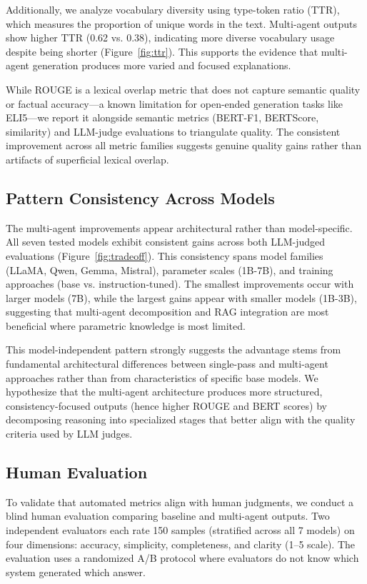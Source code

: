 Additionally, we analyze vocabulary diversity using type-token ratio (TTR), which measures the proportion of unique words in the text. Multi-agent outputs show higher TTR (0.62 vs. 0.38), indicating more diverse vocabulary usage despite being shorter (Figure~\ref{fig:ttr}). This supports the evidence that multi-agent generation produces more varied and focused explanations.

While ROUGE is a lexical overlap metric that does not capture semantic quality or factual accuracy---a known limitation for open-ended generation tasks like ELI5---we report it alongside semantic metrics (BERT-F1, BERTScore, similarity) and LLM-judge evaluations to triangulate quality. The consistent improvement across all metric families suggests genuine quality gains rather than artifacts of superficial lexical overlap.

\subsection{Pattern Consistency Across Models}



The multi-agent improvements appear architectural rather than model-specific. All seven tested models exhibit consistent gains across both LLM-judged evaluations (Figure~\ref{fig:tradeoff}). This consistency spans model families (LLaMA, Qwen, Gemma, Mistral), parameter scales (1B-7B), and training approaches (base vs. instruction-tuned). The smallest improvements occur with larger models (7B), while the largest gains appear with smaller models (1B-3B), suggesting that multi-agent decomposition and RAG integration are most beneficial where parametric knowledge is most limited.

This model-independent pattern strongly suggests the advantage stems from fundamental architectural differences between single-pass and multi-agent approaches rather than from characteristics of specific base models. We hypothesize that the multi-agent architecture produces more structured, consistency-focused outputs (hence higher ROUGE and BERT scores) by decomposing reasoning into specialized stages that better align with the quality criteria used by LLM judges.

\subsection{Human Evaluation}

To validate that automated metrics align with human judgments, we conduct a blind human evaluation comparing baseline and multi-agent outputs. Two independent evaluators each rate 150 samples (stratified across all 7 models) on four dimensions: accuracy, simplicity, completeness, and clarity (1--5 scale). The evaluation uses a randomized A/B protocol where evaluators do not know which system generated which answer.

